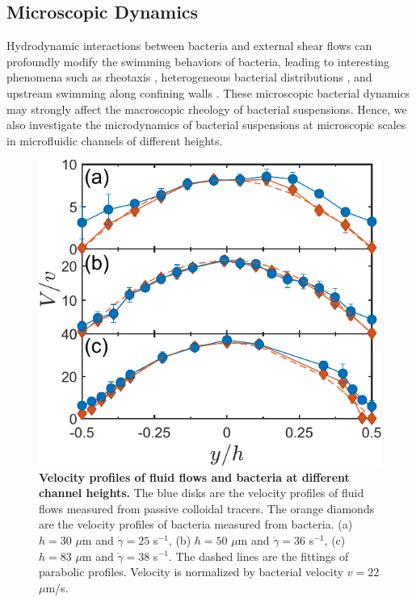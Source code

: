 \subsection{Microscopic Dynamics}
Hydrodynamic interactions between bacteria and external shear flows can profoundly modify the swimming behaviors of bacteria, leading to interesting phenomena such as rheotaxis \cite{Marcos2012}, heterogeneous bacterial distributions \cite{Rusconi2014}, and upstream swimming along confining walls \cite{Hill2007, Nash2010, Costanzo2012, Kaya2012}. These microscopic bacterial dynamics may strongly affect the macroscopic rheology of bacterial suspensions. Hence, we also investigate the microdynamics of bacterial suspensions at microscopic scales in microfluidic channels of different heights.

\begin{figure}[!ht]
	\begin{center}
	\includegraphics[width=4 in]{Figs/3-Rheo/3.pdf}
	\end{center}
	\caption[Velocity Profiles of Fluid Flows and Bacteria at Different Channel Heights]
	{
	\textbf{Velocity profiles of fluid flows and bacteria at different channel heights.}
  The blue disks are the velocity profiles of fluid flows measured from passive colloidal tracers. The orange diamonds are the velocity profiles of bacteria measured from bacteria.
  (a) $h = 30$ $\mu$m and $\dot\gamma = 25$ s$^{-1}$,
  (b) $h = 50$ $\mu$m and $\dot\gamma = 36$ s$^{-1}$,
  (c) $h = 83$ $\mu$m and $\dot\gamma = 38$ s$^{-1}$.
  The dashed lines are the fittings of parabolic profiles. Velocity is normalized by bacterial velocity $v = 22$ $\mu$m/s.
	}
	\label{fig:3-velocity-profile}
\end{figure}

